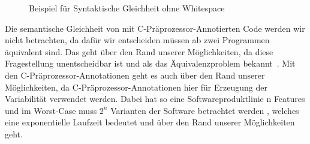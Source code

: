 \begin{figure}[H]
	\caption{Beispiel für Syntaktische Gleichheit ohne Whitespace }
\end{figure}

Die semantische Gleichheit von mit C-Präprozessor-Annotierten Code werden wir nicht betrachten, da dafür wir entscheiden müssen ab zwei Programmen äquivalent sind. Das geht über den Rand unserer Möglichkeiten, da diese Fragestellung unentscheidbar ist und als das Äquivalenzproblem bekannt~\cite{Fischer1972}. Mit den C-Präprozessor-Annotationen geht es auch über den Rand unserer Möglichkeiten, da C-Präprozessor-Annotationen hier für Erzeugung der Variabilität verwendet werden. Dabei hat so eine Softwareproduktlinie n Features und im Worst-Case muss $2^n$ Varianten der Software betrachtet werden\cite{ABKS13} , welches eine exponentielle Laufzeit bedeutet und über den Rand unserer Möglichkeiten geht.\\




